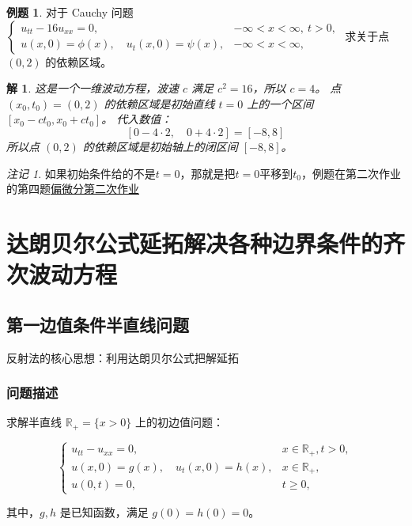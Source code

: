 \documentclass[12pt,a4paper]{article}
\numberwithin{subsection}{section}   %
\numberwithin{subsubsection}{subsection}
\theoremstyle{plain}
\newtheorem{solution}{解}[subsection]  %
\theoremstyle{definition}
\newtheorem{example}{例题}[subsection]  %
\theoremstyle{remark}
\newtheorem{remark}[theorem]{注记}
\theoremstyle{remark}
\begin{document}
		\begin{example}
		对于 Cauchy 问题
		$
		\begin{cases}
			u_{tt} - 16u_{xx} = 0, & -\infty < x < \infty, \ t > 0, \\
			u(x, 0) = \phi(x), \quad u_t(x, 0) = \psi(x), & -\infty < x < \infty,
		\end{cases}
		$
		求关于点 $(0,2)$ 的依赖区域。
	\end{example}
	\begin{solution}
		这是一个一维波动方程，波速 $c$ 满足 $c^2=16$，所以 $c=4$。
		点 $(x_0, t_0) = (0, 2)$ 的依赖区域是初始直线 $t=0$ 上的一个区间 $[x_0 - ct_0, x_0 + ct_0]$。
		代入数值：
		\[
		[0 - 4 \cdot 2, \quad 0 + 4 \cdot 2] = [-8, 8]
		\]
		所以点 $(0,2)$ 的依赖区域是初始轴上的闭区间 $[-8, 8]$。
	\end{solution}
	
	\begin{remark}
	如果初始条件给的不是$t=0$，那就是把$t=0$平移到$t_0$，例题在第二次作业的第四题\href{https://github.com/Albert-Chen04/Partial-differential-equation}{偏微分第二次作业}
	\end{remark}
	
	
	\newpage
	
	\section{达朗贝尔公式延拓解决各种边界条件的齐次波动方程}
	\subsection{第一边值条件半直线问题}
	反射法的核心思想：利用达朗贝尔公式把解延拓
	
	\subsubsection{问题描述}
	求解半直线 \(\mathbb{R}_+ = \{x > 0\}\) 上的初边值问题：
	
	\begin{equation}
		\begin{cases}
			u_{tt} - u_{xx} = 0, & x \in \mathbb{R}_+, t > 0, \\
			u(x, 0) = g(x), \quad u_t(x, 0) = h(x), & x \in \mathbb{R}_+, \\
			u(0, t) = 0, & t \geq 0,
		\end{cases}
	\end{equation}
	
	其中，\(g, h\) 是已知函数，满足 \(g(0) = h(0) = 0\)。
	
\end{document}
